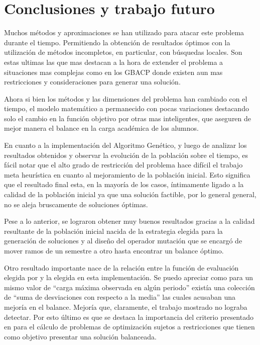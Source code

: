 \documentclass[letter, 10pt]{article}
\begin{document}
\section{Conclusiones y trabajo futuro}
Muchos métodos y aproximaciones se han utilizado para atacar este
problema durante el tiempo. Permitiendo la obtención de resultados
óptimos con la utilización de métodos incompletos, en particular, con
búsquedas locales. Son estas ultimas las que mas destacan a la hora de
extender el problema a situaciones mas complejas como en los GBACP
donde existen aun mas restricciones y consideraciones para generar una
solución.

Ahora si bien los métodos y las dimensiones del problema han cambiado con el
tiempo, el modelo matemático a permanecido con pocas variaciones
destacando solo el cambio en la función objetivo por otras mas
inteligentes, que aseguren de mejor manera el balance en la carga
académica de los alumnos.


En cuanto a la implementación del Algoritmo Genético, y luego de
analizar los resultados obtenidos y observar la evolución de la
población sobre el tiempo, es fácil notar que el alto grado de
restricción del problema hace difícil el trabajo meta heurística en
cuanto al mejoramiento de la población inicial.  Esto significa que el
resultado final esta, en la mayoría de los casos, íntimamente ligado a
la calidad de la población inicial ya que una solución factible, por
lo general general, no se aleja bruscamente de soluciones óptimas.

Pese a lo anterior, se lograron obtener muy buenos resultados gracias
a la calidad resultante de la población inicial nacida de la
estrategia elegida para la generación de soluciones y al diseño del
operador mutación que se encargó de mover ramos de un semestre a otro
hasta encontrar un balance óptimo.


Otro resultado importante nace de la relación entre la función de
evaluación elegida por \cite{castro2001variable} y la elegida en esta
implementación. Se puedo apreciar como para un mismo valor de ``carga
máxima observada en algún periodo'' existía una colección de ``suma de
desviaciones con respecto a la media'' las cuales acusaban una mejoría
en el balance. Mejoría que, claramente, el trabajo mostrado
\cite{castro2001variable} no lograba detectar. Por esto último es que
se destaca la importancia del criterio presentado en
\cite{schaus2007deviation} para el cálculo de problemas de
optimización sujetos a restricciones que tienen como objetivo
presentar una solución balanceada.
\end{document}
